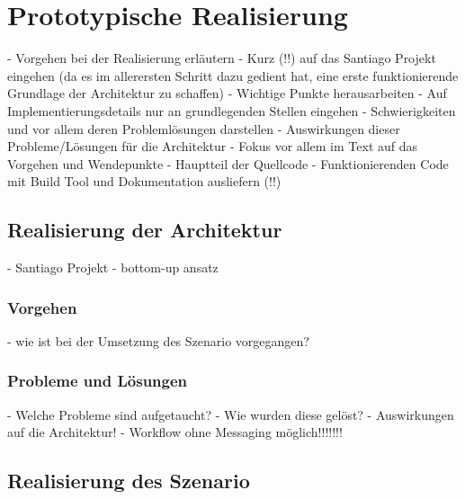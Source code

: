 
\chapter{Prototypische Realisierung} %
\label{cha:prototypische_realisierung}

- Vorgehen bei der Realisierung erläutern
- Kurz (!!) auf das Santiago Projekt eingehen (da es im allerersten Schritt dazu gedient hat, eine erste funktionierende Grundlage der Architektur zu schaffen)
- Wichtige Punkte herausarbeiten
- Auf Implementierungsdetails nur an grundlegenden Stellen eingehen
- Schwierigkeiten und vor allem deren Problemlösungen darstellen
- Auswirkungen dieser Probleme/Lösungen für die Architektur
- Fokus vor allem im Text auf das Vorgehen und Wendepunkte
- Hauptteil der Quellcode
- Funktionierenden Code mit Build Tool und Dokumentation ausliefern (!!)

\section{Realisierung der Architektur} %
\label{sec:realisierung_der_architektur}

  - Santiago Projekt
  - bottom-up ansatz
  
\subsection{Vorgehen} %
\label{sub:vorgehen_architektur}

  - wie ist bei der Umsetzung des Szenario vorgegangen?

  
\subsection{Probleme und Lösungen} %
\label{sub:probleme_und_loesungen_architektur}

  - Welche Probleme sind aufgetaucht?
  - Wie wurden diese gelöst?
  - Auswirkungen auf die Architektur!
  - Workflow ohne Messaging möglich!!!!!!!



\section{Realisierung des Szenario} %
\label{sec:realisierung_des_szenario}

